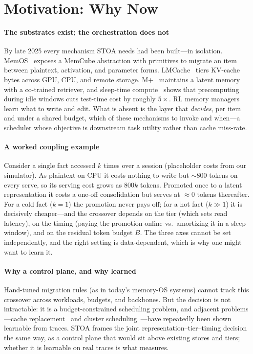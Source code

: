 \section{Motivation: Why Now}
\label{sec:motivation}

\paragraph{The substrates exist; the orchestration does not}
By late 2025 every mechanism STOA needs had been built---in isolation. MemOS~\cite{F1_li2025memos}
exposes a MemCube abstraction with primitives to migrate an item between plaintext, activation, and
parameter forms. LMCache~\cite{F5_liu2025lmcache} tiers KV-cache bytes across GPU, CPU, and remote
storage. M+~\cite{F2_wang2025mplus} maintains a latent memory with a co-trained retriever, and sleep-time
compute~\cite{F3_lin2025sleeptime} shows that precomputing during idle windows cuts test-time cost by
roughly $5\times$. RL memory managers~\cite{F6_yan2025memoryr1,F7_zhang2025memoryasaction} learn what to
write and edit. What is absent is the layer that \emph{decides}, per item and under a shared budget, which
of these mechanisms to invoke and when---a scheduler whose objective is downstream task utility rather
than cache miss-rate.

\paragraph{A worked coupling example}
Consider a single fact accessed $k$ times over a session (placeholder costs from our simulator).
As \textsf{plaintext} on \textsf{CPU} it costs nothing to write but $\sim$800 tokens on every serve, so
its serving cost grows as $800k$ tokens. Promoted once to a \textsf{latent} representation it costs a
one-off consolidation but serves at $\approx$0 tokens thereafter. For a cold fact ($k{=}1$) the promotion
never pays off; for a hot fact ($k{\gg}1$) it is decisively cheaper---and the crossover depends on the
tier (which sets read latency), on the timing (paying the promotion \textsf{online} vs.\ amortizing it in
a \textsf{sleep} window), and on the residual token budget $B$. The three axes cannot be set
independently, and the right setting is data-dependent, which is why one might want to learn it.

\paragraph{Why a control plane, and why learned}
Hand-tuned migration rules (as in today's memory-OS systems) cannot track this crossover across
workloads, budgets, and backbones. But the decision is not intractable: it is a budget-constrained
scheduling problem, and adjacent problems---cache replacement~\cite{S2_liu2020parrot,S4_coldrl2025} and
cluster scheduling~\cite{S5_mao2019decima}---have repeatedly been shown learnable from traces. STOA frames
the joint representation--tier--timing decision the same way, as a control plane that would sit above
existing stores and tiers; whether it is learnable on real traces is what  measures.
